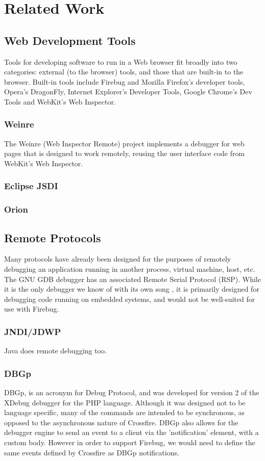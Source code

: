 
\section{Related Work}
\subsection{Web Development Tools}
Tools for developing software to run in a Web browser fit broadly into two
categories: external (to the
browser) tools, and those that are built-in to the browser.
Built-in tools include Firebug and Mozilla Firefox's developer tools,
Opera's DragonFly, Internet Explorer's Developer Tools, Google Chrome's Dev
Tools and WebKit's Web Inspector.

\subsubsection{Weinre}
The Weinre (Web Inspector Remote)\cite{wenire} project implements a debugger for
web pages that is designed to work remotely, reusing the user interface code
from WebKit's Web Inspector.

\subsubsection{Eclipse JSDI}
\subsubsection{Orion}
\subsection{Remote Protocols}
Many protocols have already been designed for the purposes of remotely debugging
an application running in another process, virtual machine, host, etc. The GNU
GDB debugger has an associated Remote Serial Protocol (RSP)\cite{gdb-rsp}. While
it is the only debugger we know of with its own song \cite{gdb-song}, it is
primarily designed for debugging code running on embedded systems, and would not be
well-suited for use with Firebug.
\subsubsection{JNDI/JDWP}
Java does remote debugging too.
\subsubsection{DBGp}
DBGp\cite{dbgp}, is an acronym for Debug Protocol, and was developed for version
2 of the XDebug debugger for the PHP language. Although it was designed not to
be language specific, many of the commands are intended to be synchronous, as
opposed to the asynchronous nature of Crossfire. DBGp also allows for the
debugger engine to send an event to a client via the 'notification' element,
with a custom body. However in order to support Firebug, we would need to define
the same events defined by Crossfire as DBGp notifications.
